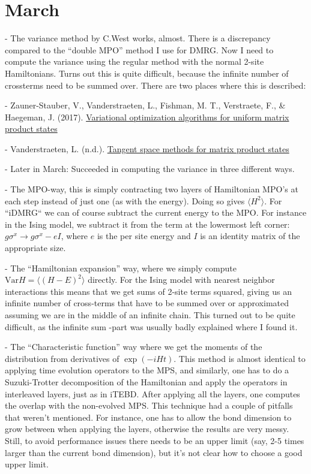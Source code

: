 \documentclass[a4paper]{article}
\begin{document}
\section*{March}
\begin{markdown}
- The variance method by C.West works, almost. There is a discrepancy compared to the ``double MPO'' method I use for DMRG. Now I need to compute the variance using the regular method with the normal 2-site Hamiltonians. Turns out this is quite difficult, because the infinite number of crossterms need to be summed over. There are two places where this is described:

	- Zauner-Stauber, V., Vanderstraeten, L., Fishman, M. T., Verstraete, F., \& Haegeman, J. (2017). \href{https://doi.org/10.1103/PhysRevB.97.045145}{Variational optimization algorithms for uniform matrix product states} 
	
	- Vanderstraeten, L. (n.d.). \href{http://quantumtensor.pks.mpg.de/wp-content/uploads/2016/06/notes_2.pdf}{Tangent space methods for matrix product states}

- Later in March: Succeeded in computing the variance in three different ways.

	- The MPO-way, this is simply contracting two layers of Hamiltonian MPO's at each step instead of just one (as with the energy). Doing so gives $\langle H^2 \rangle$. For ``iDMRG`` we can of course subtract the current energy to the MPO. For instance in the Ising model, we subtract it from the term at the lowermost left corner: $g\sigma^x \rightarrow g\sigma^x - eI$, where $e$ is the per site energy and $I$ is an identity matrix of the appropriate size.
 	
 	- The ``Hamiltonian expansion'' way, where we simply compute $\mathrm{Var} H =  \langle (H - E)^2 \rangle $ directly. For the Ising model with nearest neighbor interactions this means that we get sums of 2-site terms squared, giving us an infinite number of cross-terms that have to be summed over or approximated assuming we are in the middle of an infinite chain. This turned out to be quite difficult, as the infinite sum -part was usually badly explained where I found it. 
 	
 	- The ``Characteristic function'' way where we get the moments of the distribution from derivatives of $\exp{(-iHt)}$. This method is almost identical to applying time evolution operators to the MPS, and similarly, one has to do a Suzuki-Trotter decomposition of the Hamiltonian and apply the operators in interleaved layers, just as in iTEBD. After applying all the layers, one computes the overlap with the non-evolved MPS. This technique had a couple of pitfalls that weren't mentioned. For instance, one has to allow the bond dimension to grow between when applying the layers, otherwise the results are very messy. Still, to avoid performance issues there needs to be an upper limit (say, 2-5 times larger than the current bond dimension), but it's not clear how to choose a good upper limit. 
 	

\end{markdown}
\end{document}
